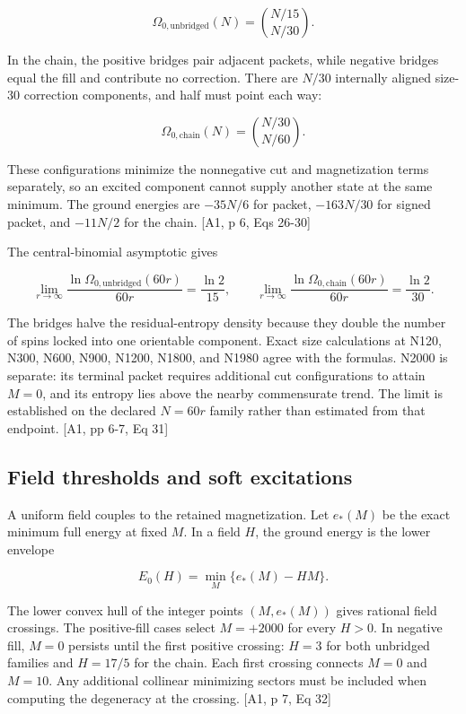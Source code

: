 \[\Omega_{0,\mathrm{unbridged}}(N)=\binom{N/15}{N/30}.\]

In the chain, the positive bridges pair adjacent packets, while negative bridges equal the fill and contribute no correction. There are \(N/30\) internally aligned size-30 correction components, and half must point each way:

\[\Omega_{0,\mathrm{chain}}(N)=\binom{N/30}{N/60}.\]

These configurations minimize the nonnegative cut and magnetization terms separately, so an excited component cannot supply another state at the same minimum. The ground energies are \(-35N/6\) for packet, \(-163N/30\) for signed packet, and \(-11N/2\) for the chain. {[}A1, p 6, Eqs 26-30{]}

The central-binomial asymptotic gives

\[\lim_{r\to\infty}\frac{\ln\Omega_{0,\mathrm{unbridged}}(60r)}{60r}=\frac{\ln2}{15},\qquad
\lim_{r\to\infty}\frac{\ln\Omega_{0,\mathrm{chain}}(60r)}{60r}=\frac{\ln2}{30}.\]

The bridges halve the residual-entropy density because they double the number of spins locked into one orientable component. Exact size calculations at N120, N300, N600, N900, N1200, N1800, and N1980 agree with the formulas. N2000 is separate: its terminal packet requires additional cut configurations to attain \(M=0\), and its entropy lies above the nearby commensurate trend. The limit is established on the declared \(N=60r\) family rather than estimated from that endpoint. {[}A1, pp 6-7, Eq 31{]}

\subsection{Field thresholds and soft excitations}\label{field-thresholds-and-soft-excitations}

A uniform field couples to the retained magnetization. Let \(e_*(M)\) be the exact minimum full energy at fixed \(M\). In a field \(H\), the ground energy is the lower envelope

\[E_0(H)=\min_M\{e_*(M)-HM\}.\]

The lower convex hull of the integer points \((M,e_*(M))\) gives rational field crossings. The positive-fill cases select \(M=+2000\) for every \(H>0\). In negative fill, \(M=0\) persists until the first positive crossing: \(H=3\) for both unbridged families and \(H=17/5\) for the chain. Each first crossing connects \(M=0\) and \(M=10\). Any additional collinear minimizing sectors must be included when computing the degeneracy at the crossing. {[}A1, p 7, Eq 32{]}

